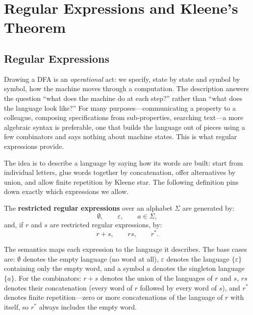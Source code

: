 \section{Regular Expressions and Kleene's Theorem}
\label{sec:regular-expressions}

\subsection{Regular Expressions}
\label{subsec:regular-expressions-syntax}

Drawing a DFA is an \emph{operational} act: we specify, state by state
and symbol by symbol, how the machine moves through a computation.
The description answers the question ``what does the machine do at each
step?'' rather than ``what does the language look like?''  For many
purposes---communicating a property to a colleague, composing
specifications from sub-properties, searching text---a more algebraic
syntax is preferable, one that builds the language out of pieces using a
few combinators and says nothing about machine states.  This is what
regular expressions provide.

The idea is to describe a language by saying how its words are built:
start from individual letters, glue words together by concatenation,
offer alternatives by union, and allow finite repetition by Kleene star.
The following definition pins down exactly which expressions we allow.

\begin{definition}
\label{def:restricted-regex}
The \textbf{restricted regular expressions} over an alphabet $\Sigma$
are generated by:
\[
  \emptyset,\qquad \varepsilon,\qquad a\in\Sigma,
\]
and, if $r$ and $s$ are restricted regular expressions, by:
\[
  r+s,\qquad rs,\qquad r^*.
\]
\end{definition}

The semantics maps each expression to the language it describes.  The
base cases are: $\emptyset$ denotes the empty language (no word at all),
$\varepsilon$ denotes the language $\{\varepsilon\}$ containing only the
empty word, and a symbol $a$ denotes the singleton language $\{a\}$.
For the combinators: $r+s$ denotes the union of the languages of $r$ and
$s$, $rs$ denotes their concatenation (every word of $r$ followed by
every word of $s$), and $r^*$ denotes finite repetition---zero or more
concatenations of the language of $r$ with itself, so $r^*$ always
includes the empty word.


